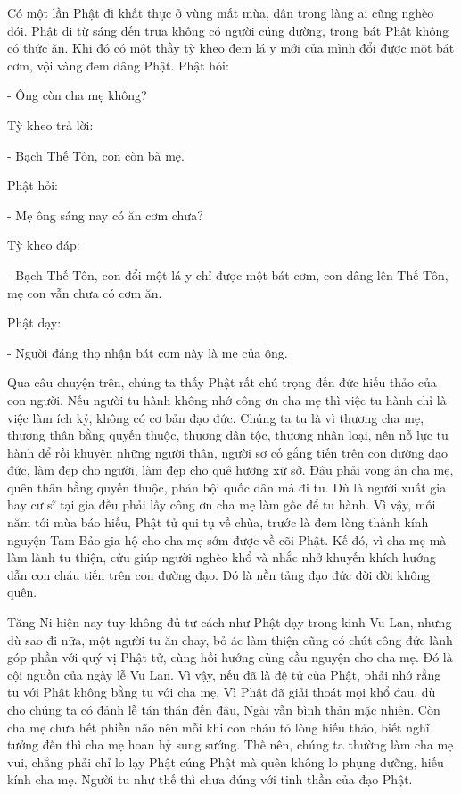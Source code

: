 \documentclass[
  12pt,
  oneside]{book}
\begin{document}
Có một lần Phật đi khất thực ở vùng mất mùa, dân trong làng ai cũng nghèo đói. Phật đi từ sáng đến trưa không có người cúng dường, trong bát Phật không có thức ăn. Khi đó có một thầy tỳ kheo đem lá y mới của mình đổi được một bát cơm, vội vàng đem dâng Phật. Phật hỏi:

- Ông còn cha mẹ không?

Tỳ kheo trả lời:

- Bạch Thế Tôn, con còn bà mẹ.

Phật hỏi:

- Mẹ ông sáng nay có ăn cơm chưa?

Tỳ kheo đáp:

- Bạch Thế Tôn, con đổi một lá y chỉ được một bát cơm, con dâng lên Thế Tôn, mẹ con vẫn chưa có cơm ăn.

Phật dạy:

- Người đáng thọ nhận bát cơm này là mẹ của ông.

Qua câu chuyện trên, chúng ta thấy Phật rất chú trọng đến đức hiếu thảo của con người. Nếu người tu hành không nhớ công ơn cha mẹ thì việc tu hành chỉ là việc làm ích kỷ, không có cơ bản đạo đức. Chúng ta tu là vì thương cha mẹ, thương thân bằng quyến thuộc, thương dân tộc, thương nhân loại, nên nỗ lực tu hành để rồi khuyên những người thân, người sơ cố gắng tiến trên con đường đạo đức, làm đẹp cho người, làm đẹp cho quê hương xứ sở. Đâu phải vong ân cha mẹ, quên thân bằng quyến thuộc, phản bội quốc dân mà đi tu. Dù là người xuất gia hay cư sĩ tại gia đều phải lấy công ơn cha mẹ làm gốc để tu hành. Vì vậy, mỗi năm tới mùa báo hiếu, Phật tử qui tụ về chùa, trước là đem lòng thành kính nguyện Tam Bảo gia hộ cho cha mẹ sớm được về cõi Phật. Kế đó, vì cha mẹ mà làm lành tu thiện, cứu giúp người nghèo khổ và nhắc nhở khuyến khích hướng dẫn con cháu tiến trên con đường đạo. Đó là nền tảng đạo đức đời đời không quên.

Tăng Ni hiện nay tuy không đủ tư cách như Phật dạy trong kinh Vu Lan, nhưng dù sao đi nữa, một người tu ăn chay, bỏ ác làm thiện cũng có chút công đức lành góp phần với quý vị Phật tử, cùng hồi hướng cùng cầu nguyện cho cha mẹ. Đó là cội nguồn của ngày lễ Vu Lan. Vì vậy, nếu đã là đệ tử của Phật, phải nhớ rằng tu với Phật không bằng tu với cha mẹ. Vì Phật đã giải thoát mọi khổ đau, dù cho chúng ta có đảnh lễ tán thán đến đâu, Ngài vẫn bình thản mặc nhiên. Còn cha mẹ chưa hết phiền não nên mỗi khi con cháu tỏ lòng hiếu thảo, biết nghĩ tưởng đến thì cha mẹ hoan hỷ sung sướng. Thế nên, chúng ta thường làm cha mẹ vui, chẳng phải chỉ lo lạy Phật cúng Phật mà quên không lo phụng dưỡng, hiếu kính cha mẹ. Người tu như thế thì chưa đúng với tinh thần của đạo Phật.
\end{document}
